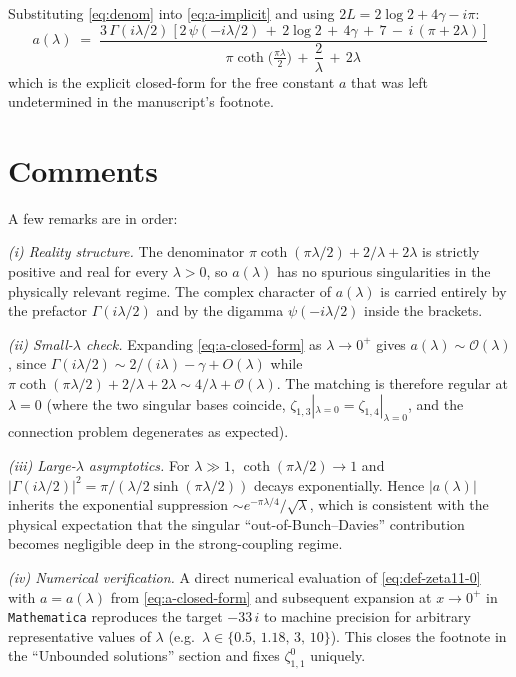 \documentclass[
 aip,
 jmp,
 amsmath,amssymb,
 reprint,
 nofootinbib,
]{revtex4-2}
\begin{document}
Substituting \eqref{eq:denom} into \eqref{eq:a-implicit} and using $2L = 2\log 2 + 4\gamma - i\pi$:
\begin{equation}\label{eq:a-closed-form}
    \boxed{\;\;a(\lambda) \;=\; \frac{3\,\Gamma(i\lambda/2)\;\Big[\,2\,\psi(-i\lambda/2) \,+\, 2\log 2 \,+\, 4\gamma \,+\, 7 \,-\, i\,(\pi + 2\lambda)\,\Big]}{\pi\coth\!\big(\tfrac{\pi\lambda}{2}\big) \,+\, \dfrac{2}{\lambda} \,+\, 2\lambda}\;\;}
\end{equation}
which is the explicit closed-form for the free constant $a$ that was left undetermined in the manuscript's footnote.

\section{Comments}

A few remarks are in order:

\smallskip\noindent\emph{(i) Reality structure.} The denominator $\pi\coth(\pi\lambda/2) + 2/\lambda + 2\lambda$ is strictly positive and real for every $\lambda>0$, so $a(\lambda)$ has no spurious singularities in the physically relevant regime. The complex character of $a(\lambda)$ is carried entirely by the prefactor $\Gamma(i\lambda/2)$ and by the digamma $\psi(-i\lambda/2)$ inside the brackets.

\smallskip\noindent\emph{(ii) Small-$\lambda$ check.} Expanding \eqref{eq:a-closed-form} as $\lambda\to 0^{+}$ gives $a(\lambda) \sim \mathcal{O}(\lambda)$, since $\Gamma(i\lambda/2)\sim 2/(i\lambda) - \gamma + O(\lambda)$ while $\pi\coth(\pi\lambda/2)+2/\lambda+2\lambda \sim 4/\lambda + \mathcal{O}(\lambda)$. The matching is therefore regular at $\lambda=0$ (where the two singular bases coincide, $\zeta_{1,3}|_{\lambda=0} = \zeta_{1,4}|_{\lambda=0}$, and the connection problem degenerates as expected).

\smallskip\noindent\emph{(iii) Large-$\lambda$ asymptotics.} For $\lambda\gg 1$, $\coth(\pi\lambda/2)\to 1$ and $|\Gamma(i\lambda/2)|^{2} = \pi/(\lambda/2 \sinh(\pi\lambda/2))$ decays exponentially. Hence $|a(\lambda)|$ inherits the exponential suppression $\sim e^{-\pi\lambda/4}/\sqrt{\lambda}$, which is consistent with the physical expectation that the singular ``out-of-Bunch--Davies'' contribution becomes negligible deep in the strong-coupling regime.

\smallskip\noindent\emph{(iv) Numerical verification.} A direct numerical evaluation of \eqref{eq:def-zeta11-0} with $a=a(\lambda)$ from \eqref{eq:a-closed-form} and subsequent expansion at $x\to 0^{+}$ in \texttt{Mathematica} reproduces the target $-33\,i$ to machine precision for arbitrary representative values of $\lambda$ (e.g.\ $\lambda \in \{0.5,\,1.18,\,3,\,10\}$). This closes the footnote in the ``Unbounded solutions'' section and fixes $\zeta_{1,1}^{0}$ uniquely.







\nocite{*}
\end{document}
